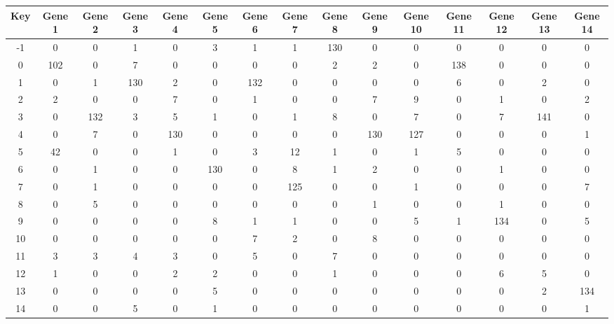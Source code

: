 \begin{tabular}{|c|c|c|c|c|c|c|c|c|c|c|c|c|c|c|}
\hline
Key & Gene 1 & Gene 2 & Gene 3 & Gene 4 & Gene 5 & Gene 6 & Gene 7 & Gene 8 & Gene 9 & Gene 10 & Gene 11 & Gene 12 & Gene 13 & Gene 14 \\
\hline
-1 & 0 & 0 & 1 & 0 & 3 & 1 & 1 & 130 & 0 & 0 & 0 & 0 & 0 & 0 \\
0 & 102 & 0 & 7 & 0 & 0 & 0 & 0 & 2 & 2 & 0 & 138 & 0 & 0 & 0 \\
1 & 0 & 1 & 130 & 2 & 0 & 132 & 0 & 0 & 0 & 0 & 6 & 0 & 2 & 0 \\
2 & 2 & 0 & 0 & 7 & 0 & 1 & 0 & 0 & 7 & 9 & 0 & 1 & 0 & 2 \\
3 & 0 & 132 & 3 & 5 & 1 & 0 & 1 & 8 & 0 & 7 & 0 & 7 & 141 & 0 \\
4 & 0 & 7 & 0 & 130 & 0 & 0 & 0 & 0 & 130 & 127 & 0 & 0 & 0 & 1 \\
5 & 42 & 0 & 0 & 1 & 0 & 3 & 12 & 1 & 0 & 1 & 5 & 0 & 0 & 0 \\
6 & 0 & 1 & 0 & 0 & 130 & 0 & 8 & 1 & 2 & 0 & 0 & 1 & 0 & 0 \\
7 & 0 & 1 & 0 & 0 & 0 & 0 & 125 & 0 & 0 & 1 & 0 & 0 & 0 & 7 \\
8 & 0 & 5 & 0 & 0 & 0 & 0 & 0 & 0 & 1 & 0 & 0 & 1 & 0 & 0 \\
9 & 0 & 0 & 0 & 0 & 8 & 1 & 1 & 0 & 0 & 5 & 1 & 134 & 0 & 5 \\
10 & 0 & 0 & 0 & 0 & 0 & 7 & 2 & 0 & 8 & 0 & 0 & 0 & 0 & 0 \\
11 & 3 & 3 & 4 & 3 & 0 & 5 & 0 & 7 & 0 & 0 & 0 & 0 & 0 & 0 \\
12 & 1 & 0 & 0 & 2 & 2 & 0 & 0 & 1 & 0 & 0 & 0 & 6 & 5 & 0 \\
13 & 0 & 0 & 0 & 0 & 5 & 0 & 0 & 0 & 0 & 0 & 0 & 0 & 2 & 134 \\
14 & 0 & 0 & 5 & 0 & 1 & 0 & 0 & 0 & 0 & 0 & 0 & 0 & 0 & 1 \\
\hline
\end{tabular}